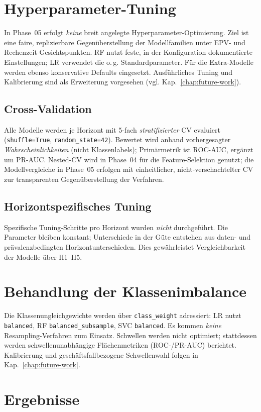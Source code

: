 \section{Hyperparameter-Tuning}
In Phase~05 erfolgt \emph{keine} breit angelegte Hyperparameter-Optimierung. Ziel ist eine faire, replizierbare Gegenüberstellung der Modellfamilien unter EPV- und Rechenzeit-Gesichtspunkten. RF nutzt feste, in der Konfiguration dokumentierte Einstellungen; LR verwendet die o.\,g. Standardparameter. Für die Extra-Modelle werden ebenso konservative Defaults eingesetzt. Ausführliches Tuning und Kalibrierung sind als Erweiterung vorgesehen (vgl. Kap.~\ref{chap:future-work}).

\subsection{Cross-Validation}
Alle Modelle werden je Horizont mit 5-fach \emph{stratifizierter} CV evaluiert (\texttt{shuffle=True}, \texttt{random\_state=42}). Bewertet wird anhand vorhergesagter \emph{Wahrscheinlichkeiten} (nicht Klassenlabels); Primärmetrik ist ROC-AUC, ergänzt um PR-AUC. Nested-CV wird in Phase~04 für die Feature-Selektion genutzt; die Modellvergleiche in Phase~05 erfolgen mit einheitlicher, nicht-verschachtelter CV zur transparenten Gegenüberstellung der Verfahren.

\subsection{Horizontspezifisches Tuning}
Spezifische Tuning-Schritte pro Horizont wurden \emph{nicht} durchgeführt. Die Parameter bleiben konstant; Unterschiede in der Güte entstehen aus daten- und prävalenzbedingten Horizontunterschieden. Dies gewährleistet Vergleichbarkeit der Modelle über H1–H5.


\section{Behandlung der Klassenimbalance}
Die Klassenungleichgewichte werden über \texttt{class\_weight} adressiert: LR nutzt \texttt{balanced}, RF \texttt{balanced\_subsample}, SVC \texttt{balanced}. Es kommen \emph{keine} Resampling-Verfahren zum Einsatz. Schwellen werden nicht optimiert; stattdessen werden schwellenunabhängige Flächenmetriken (ROC-/PR-AUC) berichtet. Kalibrierung und geschäftsfallbezogene Schwellenwahl folgen in Kap.~\ref{chap:future-work}.

\section{Ergebnisse}

\medskip

